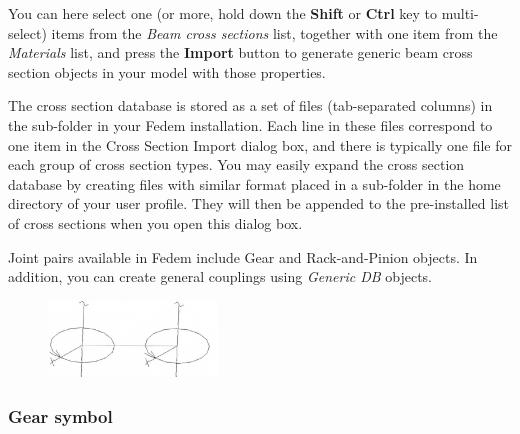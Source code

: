 You can here select one (or more, hold down the \textbf{Shift} or \textbf{Ctrl}
key to multi-select) items from the {\sl Beam cross sections} list,
together with one item from the {\sl Materials} list, and press the
\textbf{Import} button to generate generic beam cross section objects
in your model with those properties.

The cross section database is stored as a set of  files
(tab-separated columns) in the  sub-folder
in your Fedem installation. Each line in these files correspond to one
item in the Cross Section Import dialog box, and there is typically one
file for each group of cross section types. You may easily expand the
cross section database by creating files with similar format placed in a
 sub-folder in the home directory of your user profile.
They will then be appended to the pre-installed list of cross sections
when you open this dialog box.





\clearpage

Joint pairs available in Fedem include Gear and Rack-and-Pinion objects.
In addition, you can create general couplings using {\sl Generic DB} objects.




\begin{figure}
  \vspace{-5mm}
  \includegraphics[width=0.4\textwidth]{Figures/4-GearSymbol.png}
\end{figure}

\subsubsection{Gear symbol}


